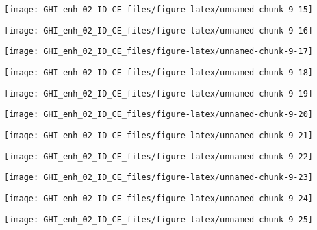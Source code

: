 \documentclass[
  10pt,
  a4paper,oneside]{article}
\begin{document}
\begin{center}\texttt{[image: GHI\_enh\_02\_ID\_CE\_files/figure-latex/unnamed-chunk-9-15]} \end{center}

\begin{center}\texttt{[image: GHI\_enh\_02\_ID\_CE\_files/figure-latex/unnamed-chunk-9-16]} \end{center}

\begin{center}\texttt{[image: GHI\_enh\_02\_ID\_CE\_files/figure-latex/unnamed-chunk-9-17]} \end{center}

\begin{center}\texttt{[image: GHI\_enh\_02\_ID\_CE\_files/figure-latex/unnamed-chunk-9-18]} \end{center}

\begin{center}\texttt{[image: GHI\_enh\_02\_ID\_CE\_files/figure-latex/unnamed-chunk-9-19]} \end{center}

\begin{center}\texttt{[image: GHI\_enh\_02\_ID\_CE\_files/figure-latex/unnamed-chunk-9-20]} \end{center}

\begin{center}\texttt{[image: GHI\_enh\_02\_ID\_CE\_files/figure-latex/unnamed-chunk-9-21]} \end{center}

\begin{center}\texttt{[image: GHI\_enh\_02\_ID\_CE\_files/figure-latex/unnamed-chunk-9-22]} \end{center}

\begin{center}\texttt{[image: GHI\_enh\_02\_ID\_CE\_files/figure-latex/unnamed-chunk-9-23]} \end{center}

\begin{center}\texttt{[image: GHI\_enh\_02\_ID\_CE\_files/figure-latex/unnamed-chunk-9-24]} \end{center}

\begin{center}\texttt{[image: GHI\_enh\_02\_ID\_CE\_files/figure-latex/unnamed-chunk-9-25]} \end{center}
\end{document}

